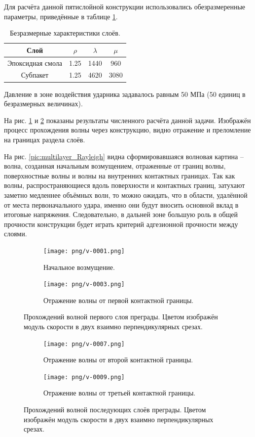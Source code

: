 Для расчёта данной пятислойной конструкции использовались обезразмеренные параметры, приведённые в таблице \ref{tbl:subpackage_2}.
\begin{table}[h]
\centering
\begin{tabular}{|c|c|c|c|}
\hline
Слой & $\rho$ & $\lambda$ & $\mu$  \\
\hline
Эпоксидная смола & 1.25 & 1440 & 960 \\
Субпакет & 1.25 & 4620 & 3080 \\
\hline
\end{tabular}
\caption{Безразмерные характеристики слоёв.}
\label{tbl:subpackage_2}
\end{table}

Давление в зоне воздействия ударника задавалось равным 50 МПа (50 единиц в безразмерных величинах).

На рис. \ref{pic:multilayer_3d_1} и \ref{pic:multilayer_3d_2} показаны результаты численного расчёта данной задачи. Изображён процесс прохождения волны через конструкцию, видно отражение и преломление на границах раздела слоёв.

На рис. \ref{pic:multilayer_Rayleigh} видна сформировавшаяся волновая картина -- волна, созданная начальным возмущением, отраженные от границ волны, поверхностные волны и волны на внутренних контактных границах. Так как волны, распространяющиеся вдоль поверхности и контактных границ, затухают заметно медленнее объёмных волн, то можно ожидать, что в области, удалённой от места первоначального удара, именно они будут вносить основной вклад в итоговые напряжения. Следовательно, в дальней зоне большую роль в общей прочности конструкции будет играть критерий адгезионной прочности между слоями.


\begin{figure}[h]
\begin{subfigure}[b]{\textwidth}
\centering
\texttt{[image: png/v-0001.png]}
\caption{Начальное возмущение.}
\end{subfigure}
\begin{subfigure}[b]{\textwidth}
\centering
\texttt{[image: png/v-0003.png]}
\caption{Отражение волны от первой контактной границы.}
\end{subfigure}
\caption{Прохождений волной первого слоя преграды. Цветом изображён модуль скорости в
двух взаимно перпендикулярных срезах.}
\label{pic:multilayer_3d_1}
\end{figure}


\begin{figure}[htp]
\begin{subfigure}[b]{\textwidth}
\centering
\texttt{[image: png/v-0007.png]}
\caption{Отражение волны от второй контактной границы.}
\end{subfigure}
\begin{subfigure}[b]{\textwidth}
\centering
\texttt{[image: png/v-0009.png]}
\caption{Отражение волны от третьей контактной границы.}
\end{subfigure}
\caption{Прохождений волной последующих слоёв преграды. Цветом изображён модуль скорости в
двух взаимно перпендикулярных срезах.}
\label{pic:multilayer_3d_2}
\end{figure}



